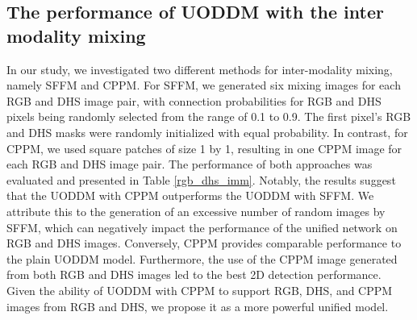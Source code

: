 \documentclass[]{modified_llncs}
\begin{document}
\subsection{The performance of UODDM with the inter modality mixing}
\begin{table}[H]
\scriptsize
\begin{center}
\end{center}
\caption {Result comparison based on mAP50 for different subgroups of UODDM and single modality only models.}
\label{rgb_dhs_imm}
\end{table}
In our study, we investigated two different methods for inter-modality mixing, namely SFFM and CPPM. For SFFM, we generated six mixing images for each RGB and DHS image pair, with connection probabilities for RGB and DHS pixels being randomly selected from the range of 0.1 to 0.9. The first pixel's RGB and DHS masks were randomly initialized with equal probability. In contrast, for CPPM, we used square patches of size 1 by 1, resulting in one CPPM image for each RGB and DHS image pair. The performance of both approaches was evaluated and presented in Table \ref{rgb_dhs_imm}. Notably, the results suggest that the UODDM with CPPM outperforms the UODDM with SFFM. We attribute this to the generation of an excessive number of random images by SFFM, which can negatively impact the performance of the unified network on RGB and DHS images. Conversely, CPPM provides comparable performance to the plain UODDM model. Furthermore, the use of the CPPM image generated from both RGB and DHS images led to the best 2D detection performance. Given the ability of UODDM with CPPM to support RGB, DHS, and CPPM images from RGB and DHS, we propose it as a more powerful unified model.
\end{document}
